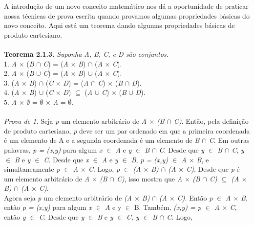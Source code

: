 \indent A introdução de um novo conceito matemático nos dá a oportunidade de praticar nossa técnicas de prova escrita quando provamos algumas propriedades básicas do novo conceito. Aqui está um teorema dando algumas propriedades básicas de produto cartesiano.
\\
\\
\textbf{Teorema 2.1.3.} \textit{Suponha A, B, C, e D são conjuntos.}
\\
1. \textit{A} $\times$ (\textit{B} $\cap$ \textit{C}) = (\textit{A} $\times$ \textit{B}) $\cap$ (\textit{A} $\times$ \textit{C}).
\\
2. \textit{A} $\times$ (\textit{B} $\cup$ \textit{C}) = (\textit{A} $\times$ \textit{B}) $\cup$ (\textit{A} $\times$ \textit{C}).
\\
3. (\textit{A} $\times$ \textit{B}) $\cap$ (\textit{C} $\times$ \textit{D}) = (\textit{A} $\cap$ \textit{C}) $\times$ (\textit{B}
$\cap$ \textit{D}).
\\
4. (\textit{A} $\times$ \textit{B}) $\cup$ (\textit{C} $\times$ \textit{D}) $\subseteq$ (\textit{A} $\cup$ \textit{C}) $\times$ (\textit{B}
$\cup$ \textit{D}).
\\
5. \textit{A} $\times$ $\emptyset$ = $\emptyset$ $\times$ \textit{A} = $\emptyset$.  
\\
\\
\textit{Prova de 1. } Seja \textit{p} um elemento arbitrário de \textit{ A $\times$ (B $\cap$ C)}. Então, pela definição de produto
cartesiano, \textit{p} deve ser um par ordenado em que a primeira coordenada é um elemento de A e a segunda coordenada é um elemento
de \textit{B $\cap$ C}. Em outras palavras, \textit{p = (x,y)} para algum \textit{x $\in$ A} e \textit{y $\in$ B $\cap$ C}.
Desde que \textit{y $\in$ B $\cap$ C}, \textit{y $\in$ B} e \textit{y $\in$ C}. Desde que \textit{x $\in$ A} e \textit{y $\in$ B},
\textit{p = (x,y) $\in$ A $\times$ B}, e simultaneamente \textit{p $\in$ A $\times$ C}. Logo, \textit{p $\in$ (A $\times$ B) 
$\cap$ (A $\times$ C)}. Desde que \textit{p} é um elemento arbitrário de \textit{ A $\times$ (B $\cap$ C)}, isso mostra que 
\textit{ A $\times$ (B $\cap$ C) $\subseteq$ (A $\times$ B) $\cap$ (A $\times$ C)}.
\\
  Agora seja \textit{p} um elemento arbitrário de \textit{(A $\times$ B) $\cap$ (A $\times$ C)}. Então \textit{p} $\in$
  \textit{A $\times$ B}, então \textit{p = (x,y)} para algum \textit{x $\in$ A} e {y $\in$ B}. Também, \textit{(x,y) = p $\in$
  A $\times$ C}, então \textit{y $\in$ C}. Desde que \textit{y $\in$ B} e \textit{y $\in$ C, y $\in$ B $\cap$ C.} Logo, 
